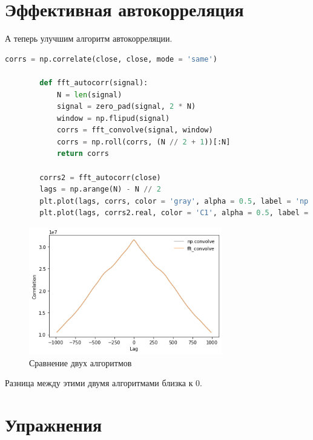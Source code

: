 \documentclass[a4paper, 12pt]{report}
\begin{document}
	\chapter{Эффективная автокорреляция}
	А теперь улучшим алгоритм автокорреляции.
	\begin{lstlisting}[language=Python,caption=Улучшенная автокорреляция]
		corrs = np.correlate(close, close, mode = 'same')

		def fft_autocorr(signal):
			N = len(signal)
			signal = zero_pad(signal, 2 * N)
			window = np.flipud(signal)
			corrs = fft_convolve(signal, window)
			corrs = np.roll(corrs, (N // 2 + 1))[:N]
			return corrs

		corrs2 = fft_autocorr(close)
		lags = np.arange(N) - N // 2
		plt.plot(lags, corrs, color = 'gray', alpha = 0.5, label = 'np.convolve')
		plt.plot(lags, corrs2.real, color = 'C1', alpha = 0.5, label = 'fft_convolve')
	\end{lstlisting}
	\begin{figure}[H]
		\centering
		\includegraphics[width=0.75\textwidth]{test14.png}
		\caption{Сравнение двух алгоритмов}
		\label{fig:test14}
	\end{figure}
	Разница между этими двумя алгоритмами близка к 0.
	
	\chapter{Упражнения}
\end{document}
